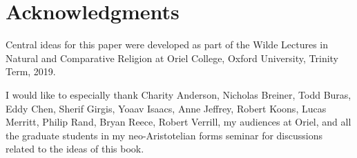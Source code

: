 \def\mychapter{Acknowledgments}



\chapter*{Acknowledgments}\label{ch:acknowledgments}
Central ideas for this paper were developed as part of the Wilde Lectures in Natural
and Comparative Religion at Oriel College, Oxford University, Trinity Term, 2019.

I would like to especially thank Charity Anderson, Nicholas Breiner, Todd Buras, Eddy Chen, Sherif Girgis, 
Yoaav Isaacs, Anne Jeffrey, Robert Koons, Lucas Merritt, Philip Rand, Bryan Reece, Robert Verrill, my audiences
at Oriel, and all the graduate students in my neo-Aristotelian forms seminar for discussions related to the 
ideas of this book.

\chaptertail 